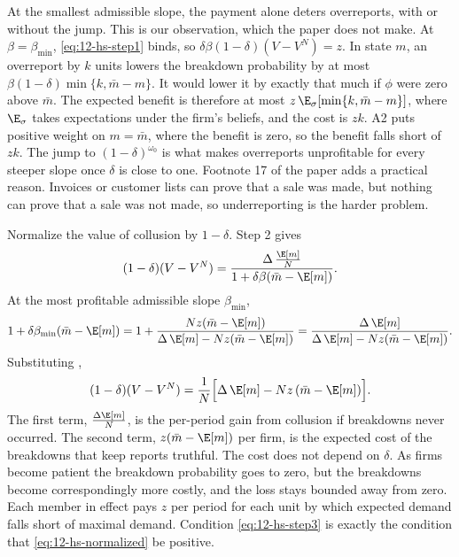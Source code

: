 \begin{remark}\label{rem:12-hs-overreport}
At the smallest admissible slope, the payment alone deters overreports, with or without the jump. This is our
observation, which the paper does not make. At $\beta = \beta_{\min}$, \eqref{eq:12-hs-step1} binds, so
$\delta\beta(1-\delta)(V - V^N) = z$. In state $m$, an overreport by $k$ units lowers the breakdown probability by
at most $\beta(1-\delta)\min\{k, \bar m - m\}$. It would lower it by exactly that much if $\phi$ were zero above
$\bar m$. The expected benefit is therefore at most $z\,\E_{\sigma}[\min\{k, \bar m - m\}]$, where $\E_{\sigma}$
takes expectations under the firm's beliefs, and the cost is $zk$. A2 puts positive weight on
$m = \bar m$, where the benefit is zero, so the benefit falls short of $zk$. The jump to $(1-\delta)^{\omega_0}$
is what makes overreports unprofitable for every steeper slope once $\delta$ is close to one. Footnote 17 of the
paper adds a practical reason. Invoices or customer lists can prove that a sale was made, but nothing can prove
that a sale was not made, so underreporting is the harder problem.
\end{remark}

Normalize the value of collusion by $1 - \delta$. Step 2 gives
\begin{equation*}
  (1-\delta)(V - V^N) = \frac{\Delta\,\frac{\E[m]}{N}}{1 + \delta\beta(\bar m - \E[m])} .
\end{equation*}
At the most profitable admissible slope $\beta_{\min}$,
\begin{equation*}
  1 + \delta\beta_{\min}(\bar m - \E[m]) = 1 + \frac{Nz(\bar m - \E[m])}{\Delta\,\E[m] - Nz(\bar m - \E[m])}
  = \frac{\Delta\,\E[m]}{\Delta\,\E[m] - Nz(\bar m - \E[m])} .
\end{equation*}
Substituting \citep[p.~2438]{HarringtonSkrzypacz2011},
\begin{equation}\label{eq:12-hs-normalized}
  (1-\delta)(V - V^N) = \frac{1}{N}\Bigl[\Delta\,\E[m] - Nz\,(\bar m - \E[m])\Bigr] .
\end{equation}
The first term, $\frac{\Delta\E[m]}{N}$, is the per-period gain from collusion if breakdowns never occurred. The
second term, $z(\bar m - \E[m])$ per firm, is the expected cost of the breakdowns that keep reports truthful. The cost
does not depend on $\delta$. As firms become patient the breakdown probability goes to zero, but the breakdowns
become correspondingly more costly, and the loss stays bounded away from zero. Each member in effect pays $z$ per
period for each unit by which expected demand falls short of maximal demand. Condition \eqref{eq:12-hs-step3} is
exactly the condition that \eqref{eq:12-hs-normalized} be positive.

